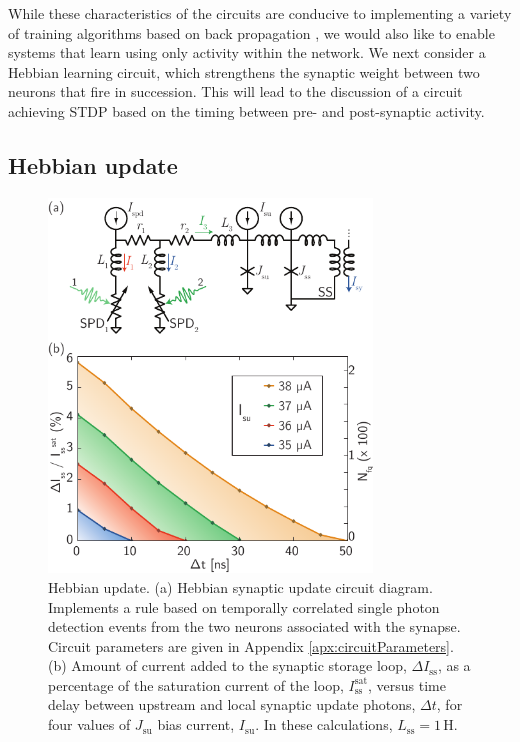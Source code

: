 \documentclass[aip,amsmath,amssymb,reprint,nofootinbib]{revtex4-1}
\begin{document}
While these characteristics of the circuits are conducive to implementing a variety of training algorithms based on back propagation \cite{ni2015}, we would also like to enable systems that learn using only activity within the network. We next consider a Hebbian learning circuit, which strengthens the synaptic weight between two neurons that fire in succession. This will lead to the discussion of a circuit achieving STDP based on the timing between pre- and post-synaptic activity.
	
\subsection{\label{sec:Hebbian}Hebbian update}
\begin{figure}[t!]
	\centerline{\includegraphics[width=8.6cm]{_synapticPlasticity_Hebbian_1_small.pdf}}
	\caption{\label{fig:synapticPlasticity_Hebbian_1}Hebbian update. (a) Hebbian synaptic update circuit diagram. Implements a rule based on temporally correlated single photon detection events from the two neurons associated with the synapse. Circuit parameters are given in Appendix \ref{apx:circuitParameters}. (b) Amount of current added to the synaptic storage loop, $\Delta I_{\mathrm{ss}}$, as a percentage of the saturation current of the loop, $I_{\mathrm{ss}}^{\mathrm{sat}}$, versus time delay between upstream and local synaptic update photons, $\Delta t$, for four values of $J_{\mathrm{su}}$ bias current, $I_{\mathrm{su}}$. In these calculations, $L_{\mathrm{ss}} = 1$\,\textmu H.}
\end{figure}
\end{document}
